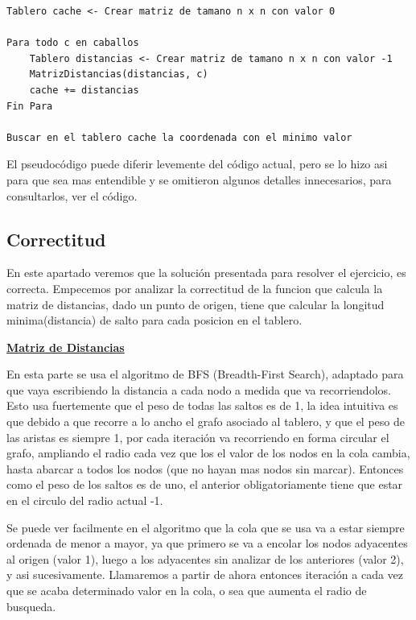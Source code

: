 \documentclass[10pt,a4paper]{article}
\begin{document}
\begin{lstlisting}
Tablero cache <- Crear matriz de tamano n x n con valor 0

Para todo c en caballos
	Tablero distancias <- Crear matriz de tamano n x n con valor -1
	MatrizDistancias(distancias, c)
	cache += distancias
Fin Para
	
Buscar en el tablero cache la coordenada con el minimo valor
\end{lstlisting}

\bigskip
El pseudocódigo puede diferir levemente del código actual, pero se lo hizo asi para que sea mas entendible y se omitieron algunos detalles innecesarios, para consultarlos, ver el código.

\newpage

\subsection{Correctitud}
En este apartado veremos que la solución presentada para resolver el ejercicio, es correcta. Empecemos por analizar la correctitud de la funcion que calcula la matriz de distancias, dado un punto de origen, tiene que calcular la longitud minima(distancia) de salto para cada posicion en el tablero.

\bigskip
\noindent \underline{\textbf{Matriz de Distancias}}

En esta parte se usa el algoritmo de BFS (Breadth-First Search), adaptado para que vaya escribiendo la distancia a cada nodo a medida que va recorriendolos. Esto usa fuertemente que el peso de todas las saltos es de 1, la idea intuitiva es que debido a que recorre a lo ancho el grafo asociado al tablero, y que el peso de las aristas es siempre 1, por cada iteración va recorriendo en forma circular el grafo, ampliando el radio cada vez que los el valor de los nodos en la cola cambia, hasta abarcar a todos los nodos (que no hayan mas nodos sin marcar). Entonces como el peso de los saltos es de uno, el anterior obligatoriamente tiene que estar en el circulo del radio actual -1.

Se puede ver facilmente en el algoritmo que la cola que se usa va a estar siempre ordenada de menor a mayor, ya que primero se va a encolar los nodos adyacentes al origen (valor 1), luego a los adyacentes sin analizar de los anteriores (valor 2), y asi sucesivamente. Llamaremos a partir de ahora entonces iteración a cada vez que se acaba determinado valor en la cola, o sea que aumenta el radio de busqueda.
\end{document}
